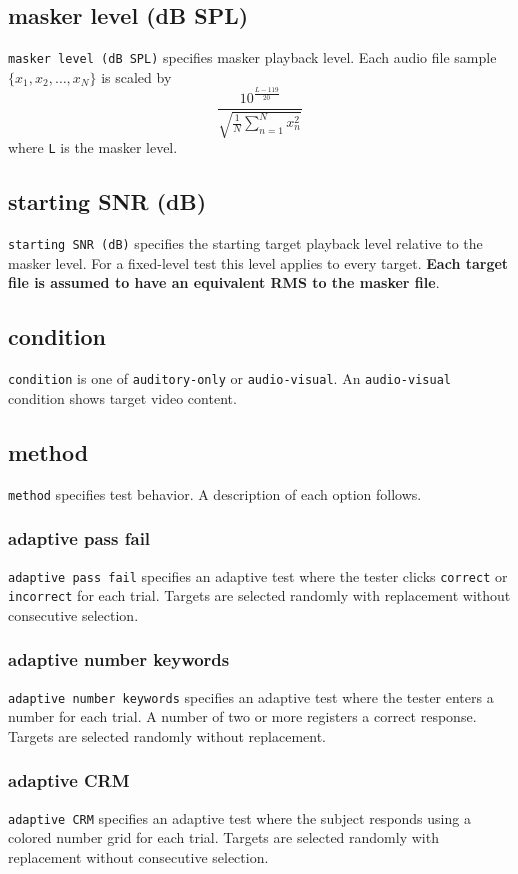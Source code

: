 \documentclass[11pt,pdftex,letterpaper]{article}
\begin{document}
\subsection{masker level (dB SPL)}
\texttt{masker level (dB SPL)} specifies masker playback level. Each audio file sample ${\displaystyle \{x_{1}, x_{2}, \dots , x_{N}\}}$ is scaled by
\begin{equation}
 \frac{10^{\frac{L-119}{20}}}{\sqrt{\frac{1}{N}\sum_{n=1}^{N}x_{n}^{2}}}\label{eq:masker-scale}
\end{equation}
where \texttt{L} is the masker level.
\subsection{starting SNR (dB)}
\texttt{starting SNR (dB)} specifies the starting target playback level relative to the masker level. For a fixed-level test this level applies to every target. \textbf{Each target file is assumed to have an equivalent RMS to the masker file}.
\subsection{condition}
\texttt{condition} is one of \texttt{auditory-only} or \texttt{audio-visual}. An \texttt{audio-visual} condition shows target video content.
\subsection{method}
\texttt{method} specifies test behavior. A description of each option follows.
\subsubsection{adaptive pass fail}
\texttt{adaptive pass fail} specifies an adaptive test where the tester clicks \texttt{correct} or \texttt{incorrect} for each trial. Targets are selected randomly with replacement without consecutive selection.
\subsubsection{adaptive number keywords}
\texttt{adaptive number keywords} specifies an adaptive test where the tester enters a number for each trial. A number of two or more registers a correct response. Targets are selected randomly without replacement.
\subsubsection{adaptive CRM}
\texttt{adaptive CRM} specifies an adaptive test where the subject responds using a colored number grid for each trial. Targets are selected randomly with replacement without consecutive selection.
\end{document}
